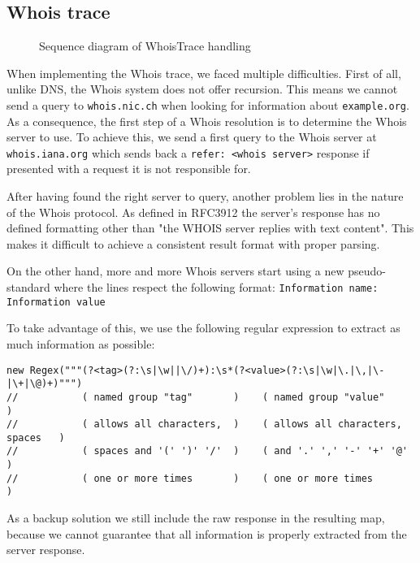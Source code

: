 \documentclass[
	a4paper,					10pt,							twoside,					openright,				notitlepage,			parskip=half,			]{scrreprt}
\begin{document}
\subsection{Whois trace}
\label{subsec:api_libstruct_whois}

\begin{figure}[H] 
\caption{Sequence diagram of WhoisTrace handling}
\label{fig:seq-whoistrace}
\end{figure}

When implementing the Whois trace, we faced multiple difficulties. First of all, unlike \gls{DNS}, the Whois system
does not offer recursion. This means we cannot send a query to \verb|whois.nic.ch| when looking for information about
\verb|example.org|. As a consequence, the first step of a Whois resolution is to determine the Whois server to use. 
To achieve this, we send a first query to the Whois server at \verb|whois.iana.org| which sends 
back a \verb|refer: <whois server>| response if presented with a request it is not responsible for. 

After having found the right server to query, another problem lies in the nature of the Whois protocol. 
As defined in \gls{RFC}3912\cite{rfc:whois} the server's response has no defined formatting other than 
"the WHOIS server replies with text content". This makes it difficult to 
achieve a consistent result format with proper parsing.

On the other hand, more and more Whois servers start using a new pseudo-standard where
the lines respect the following format: \verb|Information name:  Information value| 

\newpage
To take advantage of this, we use the following 
regular expression to extract as much information as possible:

\begin{lstlisting}[language={}]
new Regex("""(?<tag>(?:\s|\w||\/)+):\s*(?<value>(?:\s|\w|\.|\,|\-|\+|\@)+)""")
//           ( named group "tag"       )    ( named group "value"             )
//           ( allows all characters,  )    ( allows all characters, spaces   )
//           ( spaces and '(' ')' '/'  )    ( and '.' ',' '-' '+' '@'         )
//           ( one or more times       )    ( one or more times               )
\end{lstlisting}

As a backup solution we still include the raw response in the resulting map, 
because we cannot guarantee that all information is properly
extracted from the server response.
\end{document}
